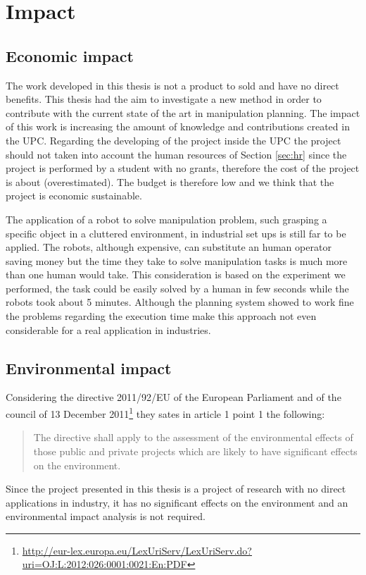 \section{Impact}
\subsection*{Economic impact}
The work developed in this thesis is not a product to sold and have no direct benefits. This thesis had the aim to investigate a new method in order to contribute with the current state of the art in manipulation planning. The impact of this work is increasing the amount of knowledge and contributions created in the UPC. Regarding the developing of the project inside the UPC the project should not taken into account the human resources of Section \ref{sec:hr} since the project is performed by a student with no grants, therefore the cost of the project is about  (overestimated). The budget is therefore low and we think that the project is economic sustainable.

The application of a robot to solve manipulation problem, such grasping a specific object in a cluttered environment, in industrial set ups is still far to be applied. The robots, although expensive, can substitute an human operator saving money but the time they take to solve manipulation tasks is much more than one human would take. This consideration is based on the experiment we performed, the task could be easily solved by a human in few seconds while the robots took about 5 minutes. Although the planning system showed to work fine the problems regarding the execution time make this approach not even considerable for a real application in industries.

\subsection*{Environmental impact}
Considering the directive 2011/92/EU of the European Parliament and of the council of 13 December 2011\footnote{\href{http://eur-lex.europa.eu/LexUriServ/LexUriServ.do?uri=OJ:L:2012:026:0001:0021:En:PDF}{\url{http://eur-lex.europa.eu/LexUriServ/LexUriServ.do?uri=OJ:L:2012:026:0001:0021:En:PDF}}}
they sates in article 1 point 1 the following:
\begin{quote}
The directive shall apply to the assessment of the environmental effects of those public and private projects which are likely to have significant effects on the environment.
\end{quote}
Since the project presented in this thesis is a project of research with no direct applications in industry, it has no significant effects on the environment and an environmental impact analysis is not required.


